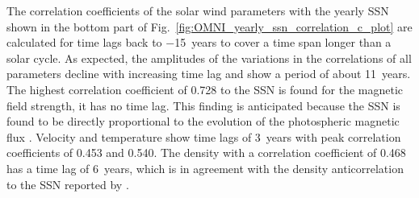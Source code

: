 The correlation coefficients of the solar wind parameters with the yearly SSN shown in the bottom part of Fig.~\ref{fig:OMNI_yearly_ssn_correlation_c_plot} are calculated for time lags back to \num{-15}~years to cover a time span longer than a solar cycle. As expected, the amplitudes of the variations in the correlations of all parameters decline with increasing time lag and show a period of about 11~years. The highest correlation coefficient of 0.728 to the SSN is found for the magnetic field strength, it has no time lag. This finding is anticipated because the SSN is found to be directly proportional to the evolution of the photospheric magnetic flux \citep{Smith2003}.
Velocity and temperature show time lags of 3~years with peak correlation coefficients of 0.453 and 0.540. The density with a correlation coefficient of 0.468 has a time lag of 6~years, which is in agreement with the density anticorrelation to the SSN reported by \citet{Bougeret1984}.	%

